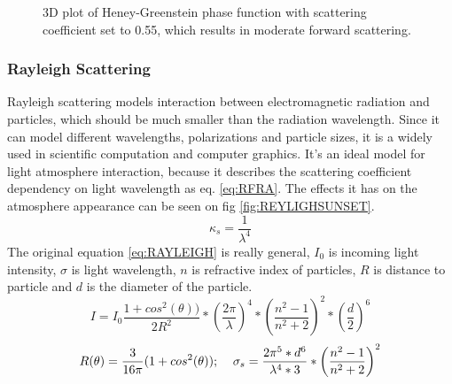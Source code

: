 \begin{minipage}{\linewidth}
\begin{minipage}{0.45\linewidth}
\begin{figure}[H]
              \captionsetup{width=\linewidth}
              \caption[3D plot Heney-Greenstein]{3D plot of Heney-Greenstein phase function with scattering coefficient set to 0.55, which results in moderate forward scattering. }\label{fig:HG3}
          \end{figure}
      \end{minipage}
  \end{minipage}


\subsubsection{Rayleigh Scattering}
\label{lab:REY}
Rayleigh scattering models interaction between electromagnetic radiation and particles, which should be much smaller than the radiation wavelength. Since it can model different wavelengths, polarizations and particle sizes, it is a widely used in scientific computation and computer graphics. It's an ideal model for light atmosphere interaction, because it describes the scattering coefficient dependency on light wavelength as eq. \ref{eq:RFRA}. The effects it has on the atmosphere appearance can be seen on fig \ref{fig:REYLIGHSUNSET}.
\begin{equation}
\label{eq:RFRA}
\kappa_{s}=\frac{1}{\lambda^{4}} 
\end{equation}
The original equation \ref{eq:RAYLEIGH} is really general, $I_0$ is incoming light intensity, $\sigma$ is light wavelength, $n$ is refractive index of particles, $R$ is distance to particle and $d$ is the diameter of the particle. 
\begin{equation}
\label{eq:RAYLEIGH}
I=I_{0}\frac{1+cos^{2}(\theta))}{2R^2}*\left(\frac{2\pi}{\lambda}\right)^{4}*\left(\frac{n^{2}-1}{n^{2}+2}\right)^2*\left(\frac{d}{2}\right)^6
\end{equation}
\begin{equation}
\label{eq:RAYLEIGH2}
R(\theta)=\frac{3}{16\pi}(1+cos^{2}(\theta)); \text{\;\;\;\;} \sigma_{s}=\frac{2\pi^{5}*d^{6}}{\lambda^{4}*3}*\left(\frac{n^{2}-1}{n^{2}+2}\right)^2
\end{equation}

